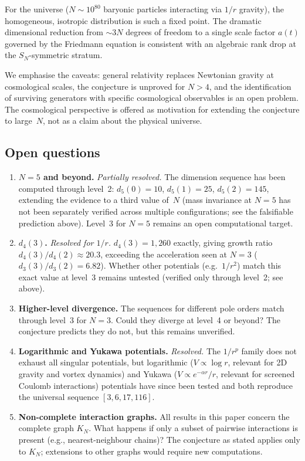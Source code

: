 \documentclass[11pt,a4paper]{article}
\theoremstyle{remark}
\newcommand{\SN}{S_N}
\begin{document}
For the universe ($N \sim 10^{80}$ baryonic particles
interacting via $1/r$ gravity), the homogeneous,
isotropic distribution is such a fixed point.  The
dramatic dimensional reduction from $\sim 3N$ degrees
of freedom to a single scale factor $a(t)$ governed by
the Friedmann equation is consistent with an algebraic
rank drop at the $\SN$-symmetric stratum.

We emphasise the caveats: general relativity replaces
Newtonian gravity at cosmological scales, the conjecture
is unproved for $N > 4$, and the identification of
surviving generators with specific cosmological
observables is an open problem.  The cosmological
perspective is offered as motivation for extending the
conjecture to large~$N$, not as a claim about the
physical universe.

\subsection{Open questions}

\begin{enumerate}
  \item \textbf{$N{=}5$ and beyond.} \emph{Partially
    resolved.}  The dimension sequence has been computed
    through level~2: $d_5(0) = 10$, $d_5(1) = 25$,
    $d_5(2) = 145$, extending the evidence to a third
    value of~$N$ (mass invariance at $N{=}5$ has not been
    separately verified across multiple configurations;
    see the falsifiable prediction above).  Level~3 for
    $N{=}5$ remains an open computational target.

  \item \textbf{$d_4(3)$.} \emph{Resolved for $1/r$.}
    $d_4(3) = 1{,}260$ exactly, giving growth ratio
    $d_4(3)/d_4(2) \approx 20.3$, exceeding the
    acceleration seen at $N{=}3$
    ($d_3(3)/d_3(2) = 6.82$).  Whether other potentials
    (e.g.\ $1/r^2$) match this exact value at level~3
    remains untested (verified only through level~2; see
    above).

  \item \textbf{Higher-level divergence.}  The sequences
    for different pole orders match through level~3 for
    $N{=}3$.  Could they diverge at level~4 or beyond?
    The conjecture predicts they do not, but this
    remains unverified.

  \item \textbf{Logarithmic and Yukawa potentials.}
    \emph{Resolved.}  The $1/r^p$ family does not exhaust
    all singular potentials, but logarithmic
    ($V \propto \log r$, relevant for 2D gravity and
    vortex dynamics) and Yukawa ($V \propto e^{-\alpha
    r}/r$, relevant for screened Coulomb interactions)
    potentials have since been tested and both reproduce
    the universal sequence $[3, 6, 17, 116]$.

  \item \textbf{Non-complete interaction graphs.}
    All results in this paper concern the complete graph
    $K_N$.  What happens if only a subset of pairwise
    interactions is present (e.g., nearest-neighbour
    chains)?  The conjecture as stated applies only to
    $K_N$; extensions to other graphs would require new
    computations.
\end{enumerate}
\end{document}

